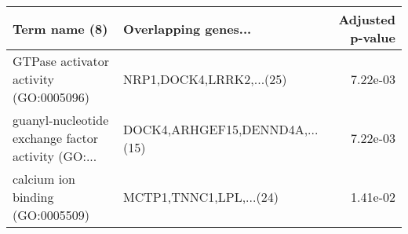 \begin{tabular}{llr}
\toprule
                                     Term name (8) &           Overlapping genes... &  Adjusted p-value \\
\midrule
            GTPase activator activity (GO:0005096) &       NRP1,DOCK4,LRRK2,...(25) &          7.22e-03 \\
guanyl-nucleotide exchange factor activity (GO:... & DOCK4,ARHGEF15,DENND4A,...(15) &          7.22e-03 \\
                  calcium ion binding (GO:0005509) &        MCTP1,TNNC1,LPL,...(24) &          1.41e-02 \\
\bottomrule
\end{tabular}
